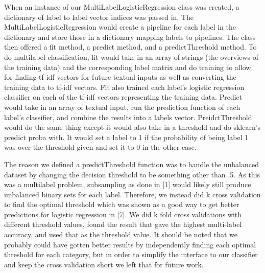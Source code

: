 \documentclass[sigconf]{acmart}
\begin{document}
When an instance of our MultiLabelLogisticRegression class was created, a dictionary of label to label vector indices was passed in.  The MultiLabelLogisticRegression would create a pipeline for each label in the dictionary and store those in a dictionary mapping labels to pipelines. The class then offered a fit method, a predict method, and a predictThreshold method. To do multilabel classification, fit would take in an array of strings (the overviews of the training data) and the corresponding label matrix and do training to allow for finding tf-idf vectors for future textual inputs as well as converting the training data to tf-idf vectors. Fit also trained each label's logistic regression classifier on each of the tf-idf vectors representing the training data. Predict would take in an array of textual input, run the prediction function of each label's classifier, and combine the results into a labels vector.  PreidctThreshold would do the same thing except it would also take in a threshold and do sklearn's predict proba with. It would set a label to 1 if the probability of being label 1 was over the threshold given and set it to 0 in the other case. 

The reason we defined a predictThreshold function was to handle the unbalanced dataset by changing the decision threshold to be something other than .5.  As this was a multilabel problem, subsampling as done in [1] would likely still produce unbalanced binary sets for each label.  Therefore, we instead did k cross validation to find the optimal threshold which was shown as a good way to get better predictions for logistic regression in [7]. We did k fold cross validations with different threshold values, found the result that gave the highest multi-label accuracy, and used that as the threshold value.  It should be noted that we probably could have gotten better results by independently finding each optimal threshold for each category, but in order to simplify the interface to our classifier and keep the cross validation short we left that for future work. 
\end{document}
